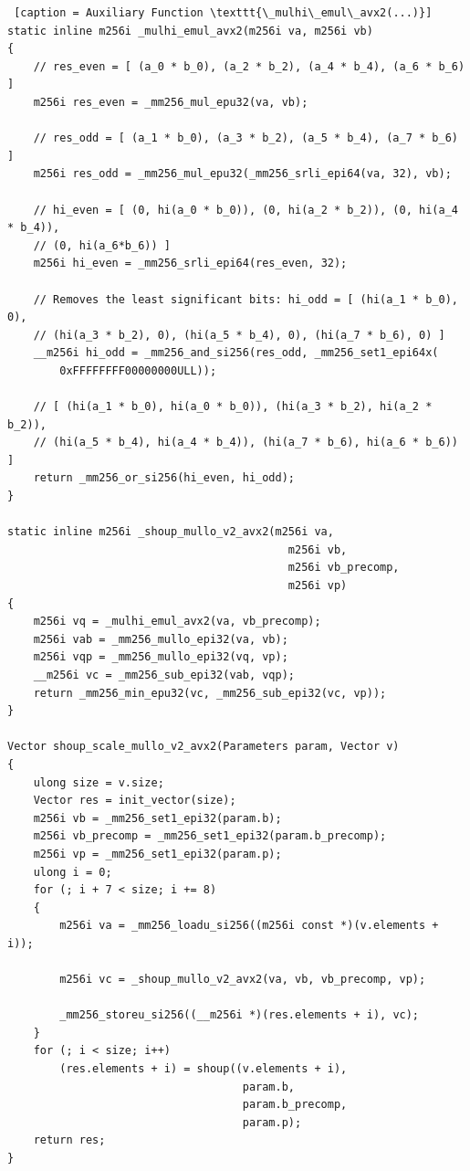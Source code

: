 \documentclass{article}
\begin{document}
\begin{lstlisting} [caption = Auxiliary Function \texttt{\_mulhi\_emul\_avx2(...)}]
static inline m256i _mulhi_emul_avx2(m256i va, m256i vb)
{
    // res_even = [ (a_0 * b_0), (a_2 * b_2), (a_4 * b_4), (a_6 * b_6) ]
    m256i res_even = _mm256_mul_epu32(va, vb);

    // res_odd = [ (a_1 * b_0), (a_3 * b_2), (a_5 * b_4), (a_7 * b_6) ]
    m256i res_odd = _mm256_mul_epu32(_mm256_srli_epi64(va, 32), vb);

    // hi_even = [ (0, hi(a_0 * b_0)), (0, hi(a_2 * b_2)), (0, hi(a_4 * b_4)),
    // (0, hi(a_6*b_6)) ]
    m256i hi_even = _mm256_srli_epi64(res_even, 32);

    // Removes the least significant bits: hi_odd = [ (hi(a_1 * b_0), 0),
    // (hi(a_3 * b_2), 0), (hi(a_5 * b_4), 0), (hi(a_7 * b_6), 0) ]
    __m256i hi_odd = _mm256_and_si256(res_odd, _mm256_set1_epi64x(
        0xFFFFFFFF00000000ULL));

    // [ (hi(a_1 * b_0), hi(a_0 * b_0)), (hi(a_3 * b_2), hi(a_2 * b_2)),
    // (hi(a_5 * b_4), hi(a_4 * b_4)), (hi(a_7 * b_6), hi(a_6 * b_6)) ]
    return _mm256_or_si256(hi_even, hi_odd);
}

static inline m256i _shoup_mullo_v2_avx2(m256i va,
                                           m256i vb,
                                           m256i vb_precomp,
                                           m256i vp)
{
    m256i vq = _mulhi_emul_avx2(va, vb_precomp);
    m256i vab = _mm256_mullo_epi32(va, vb);
    m256i vqp = _mm256_mullo_epi32(vq, vp);
    __m256i vc = _mm256_sub_epi32(vab, vqp);
    return _mm256_min_epu32(vc, _mm256_sub_epi32(vc, vp));
}

Vector shoup_scale_mullo_v2_avx2(Parameters param, Vector v)
{
    ulong size = v.size;
    Vector res = init_vector(size);
    m256i vb = _mm256_set1_epi32(param.b);
    m256i vb_precomp = _mm256_set1_epi32(param.b_precomp);
    m256i vp = _mm256_set1_epi32(param.p);
    ulong i = 0;
    for (; i + 7 < size; i += 8)
    {
        m256i va = _mm256_loadu_si256((m256i const *)(v.elements + i));

        m256i vc = _shoup_mullo_v2_avx2(va, vb, vb_precomp, vp);

        _mm256_storeu_si256((__m256i *)(res.elements + i), vc);
    }
    for (; i < size; i++)
        (res.elements + i) = shoup((v.elements + i),
                                    param.b,
                                    param.b_precomp,
                                    param.p);
    return res;
}
\end{lstlisting}
\end{document}
